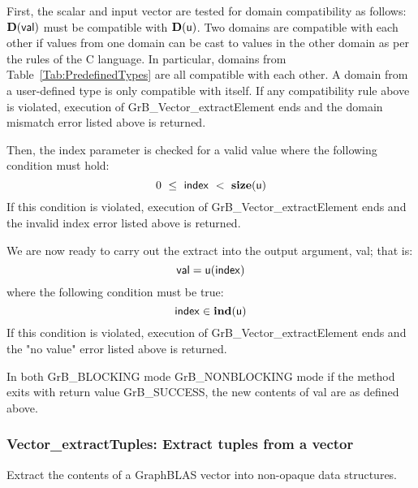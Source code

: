 First, the scalar and input vector are tested for domain compatibility as follows:
$\mathbf{D}({\sf val})$ must be compatible with $\mathbf{D}({\sf u})$. Two domains 
are compatible with each other if values from one domain can be cast to values 
in the other domain as per the rules of the C language. In particular, domains 
from Table~\ref{Tab:PredefinedTypes} are all compatible with each other. A domain 
from a user-defined type is only compatible with itself. If any compatibility 
rule above is violated, execution of {\sf GrB\_Vector\_extractElement} ends and 
the domain mismatch error listed above is returned.

Then, the {\sf index} parameter is checked for a valid value where the following
condition must hold:
\[
	0\ \leq\ {\sf index}\ <\ \mathbf{size}({\sf u})
\]
If this condition is violated, execution of {\sf GrB\_Vector\_extractElement} 
ends and the invalid index error listed above is returned.

We are now ready to carry out the extract into the output argument, {\sf val};  
that is:
\[
    {\sf val} = {\sf u}({\sf index})
\]
where the following condition must be true:
\[
    {\sf index} \in \mathbf{ind}({\sf u})
\]
If this condition is violated, execution of {\sf GrB\_Vector\_extractElement} 
ends and the "no value" error listed above is returned.

In both {\sf GrB\_BLOCKING} mode {\sf GrB\_NONBLOCKING} mode
if the method exits with return value {\sf GrB\_SUCCESS}, the  new 
contents of {\sf val} are as defined above.  



\subsubsection{{\sf Vector\_extractTuples}: Extract tuples from a vector}
\label{Sec:Vector_extractTuples}

Extract the contents of a GraphBLAS vector into non-opaque data structures.

